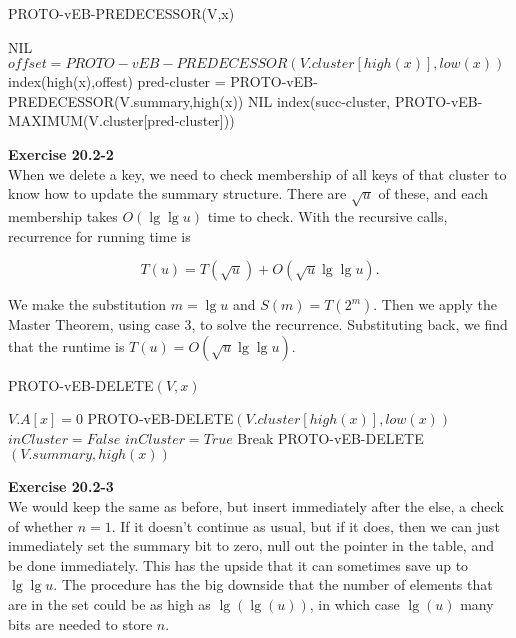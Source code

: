 \documentclass{article}
\begin{document}
\begin{algorithm}
\caption{PROTO-vEB-PREDECESSOR(V,x)}
\begin{algorithmic}
\State {}
\Else
\State \Return NIL
\EndIf
\Else
\State $offset = PROTO-vEB-PREDECESSOR(V.cluster[high(x)],low(x))$
\State \Return index(high(x),offest)
\Else
\State pred-cluster = PROTO-vEB-PREDECESSOR(V.summary,high(x))
\State \Return NIL
\Else
\State \Return index(succ-cluster, PROTO-vEB-MAXIMUM(V.cluster[pred-cluster]))
\EndIf
\EndIf
\EndIf
\end{algorithmic}
\end{algorithm}

\noindent\textbf{Exercise 20.2-2}\\

When we delete a key, we need to check membership of all keys of that cluster to know how to update the summary structure.  There are $\sqrt{u}$ of these, and each membership takes $O(\lg \lg u)$ time to check.  With the recursive calls, recurrence for running time is 

\[ T(u) = T(\sqrt{u}) + O(\sqrt{u}\lg \lg u).\]

We make the substitution $m = \lg u$ and $S(m) = T(2^m)$. Then we apply the Master Theorem, using case 3, to solve the recurrence.  Substituting back, we find that the runtime is $T(u) = O(\sqrt{u} \lg \lg u)$.\\

\begin{algorithm}
\caption{PROTO-vEB-DELETE$(V,x)$}
\begin{algorithmic}
	\State $V.A[x] = 0$
\Else
	\State PROTO-vEB-DELETE$(V.cluster[high(x)], low(x))$
	\State $inCluster = False$
			\State $inCluster = True$
			\State Break
		\EndIf
	\EndFor
		\State PROTO-vEB-DELETE$(V.summary, high(x))$
	\EndIf
\EndIf
\end{algorithmic}
\end{algorithm}


\noindent\textbf{Exercise 20.2-3}\\

We would keep the same as before, but insert immediately after the else, a check of whether $n=1$. If it doesn't continue as usual, but if it does, then we can just immediately set the summary bit to zero, null out the pointer in the table, and be done immediately. This has the upside that it can sometimes save up to $\lg \lg u$. The procedure has the big downside that the number of elements that are in the set could be as high as $\lg(\lg(u))$, in which case $\lg(u)$ many bits are needed to store $n$.
\end{document}
